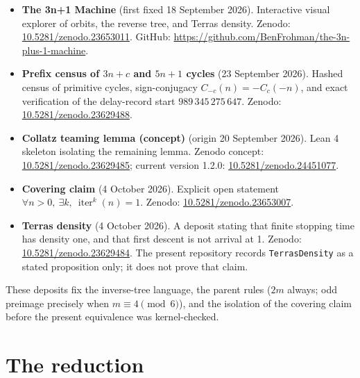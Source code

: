 \documentclass[11pt]{article}
\begin{document}
\begin{itemize}
\item \textbf{The 3n+1 Machine} (first fixed 18 September 2026). Interactive visual explorer of orbits, the reverse tree, and Terras density. Zenodo: \href{https://doi.org/10.5281/zenodo.23653011}{10.5281/zenodo.23653011}. GitHub: \url{https://github.com/BenFrohman/the-3n-plus-1-machine}.
\item \textbf{Prefix census of $3n+c$ and $5n+1$ cycles} (23 September 2026). Hashed census of primitive cycles, sign-conjugacy $C_{-c}(n)=-C_c(-n)$, and exact verification of the delay-record start $989\,345\,275\,647$. Zenodo: \href{https://doi.org/10.5281/zenodo.23629488}{10.5281/zenodo.23629488}.
\item \textbf{Collatz teaming lemma (concept)} (origin 20 September 2026). Lean 4 skeleton isolating the remaining lemma. Zenodo concept: \href{https://doi.org/10.5281/zenodo.23629485}{10.5281/zenodo.23629485}; current version 1.2.0: \href{https://doi.org/10.5281/zenodo.24451077}{10.5281/zenodo.24451077}.
\item \textbf{Covering claim} (4 October 2026). Explicit open statement $\forall n>0,\ \exists k,\ \operatorname{iter}^k(n)=1$. Zenodo: \href{https://doi.org/10.5281/zenodo.23653007}{10.5281/zenodo.23653007}.
\item \textbf{Terras density} (4 October 2026). A deposit stating that finite stopping time has density one, and that first descent is not arrival at 1. Zenodo: \href{https://doi.org/10.5281/zenodo.23629484}{10.5281/zenodo.23629484}. The present repository records \texttt{TerrasDensity} as a stated proposition only; it does not prove that claim.
\end{itemize}

These deposits fix the inverse-tree language, the parent rules ($2m$ always; odd preimage precisely when $m\equiv 4\pmod 6$), and the isolation of the covering claim before the present equivalence was kernel-checked.

\section{The reduction}
\end{document}
